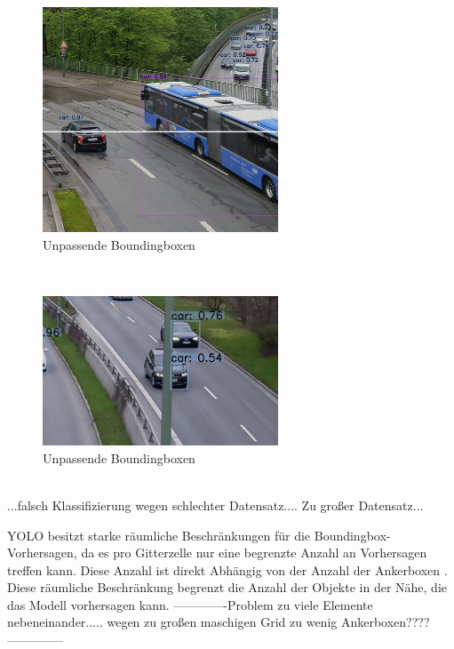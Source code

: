 \documentclass[conference]{IEEEtran}
\begin{document}
	\begin{figure}[!h]
		\begin{center}
			\includegraphics[width=7cm]{Media/Output_777 - Kopie.jpg}
			\caption{Unpassende Boundingboxen}
			\label{UB}
		\end{center}
	\end{figure}\\
	\begin{figure}[!h]
		\begin{center}
			\includegraphics[width=7cm]{Media/Output_276 - Kopie.jpg}
			\caption{Unpassende Boundingboxen}
			\label{UB2}
		\end{center}
	\end{figure}\\

	...falsch Klassifizierung wegen schlechter Datensatz....
	Zu großer Datensatz...
	
	YOLO besitzt starke räumliche Beschränkungen für die Boundingbox-Vorhersagen, da es pro Gitterzelle nur eine begrenzte Anzahl an Vorhersagen treffen kann. Diese Anzahl ist direkt Abhängig von der Anzahl der Ankerboxen \cite{b3}. Diese räumliche Beschränkung begrenzt die Anzahl der Objekte in der Nähe, die das Modell vorhersagen kann. 
	-------------Problem zu viele Elemente nebeneinander..... wegen zu großen maschigen Grid zu wenig Ankerboxen????--------------
\end{document}
